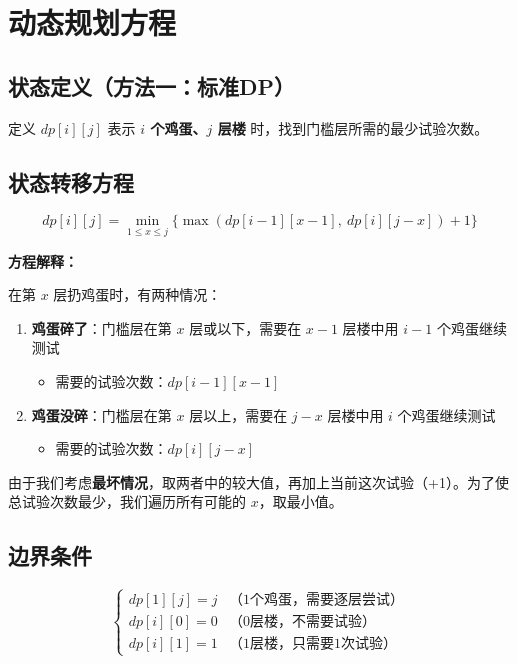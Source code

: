 \documentclass[12pt,a4paper]{article}
\begin{document}
\section{动态规划方程}

\subsection{状态定义（方法一：标准DP）}

定义 $dp[i][j]$ 表示 \textbf{$i$ 个鸡蛋、$j$ 层楼} 时，找到门槛层所需的最少试验次数。

\subsection{状态转移方程}

\begin{equation}
dp[i][j] = \min_{1 \leq x \leq j} \{ \max(dp[i-1][x-1],\ dp[i][j-x]) + 1 \}
\end{equation}

\textbf{方程解释：}

在第 $x$ 层扔鸡蛋时，有两种情况：
\begin{enumerate}
    \item \textbf{鸡蛋碎了}：门槛层在第 $x$ 层或以下，需要在 $x-1$ 层楼中用 $i-1$ 个鸡蛋继续测试
    \begin{itemize}
        \item 需要的试验次数：$dp[i-1][x-1]$
    \end{itemize}
    \item \textbf{鸡蛋没碎}：门槛层在第 $x$ 层以上，需要在 $j-x$ 层楼中用 $i$ 个鸡蛋继续测试
    \begin{itemize}
        \item 需要的试验次数：$dp[i][j-x]$
    \end{itemize}
\end{enumerate}

由于我们考虑\textbf{最坏情况}，取两者中的较大值，再加上当前这次试验（+1）。为了使总试验次数最少，我们遍历所有可能的 $x$，取最小值。

\subsection{边界条件}

\begin{equation}
\begin{cases}
dp[1][j] = j & \text{（1个鸡蛋，需要逐层尝试）} \\
dp[i][0] = 0 & \text{（0层楼，不需要试验）} \\
dp[i][1] = 1 & \text{（1层楼，只需要1次试验）}
\end{cases}
\end{equation}
\end{document}
